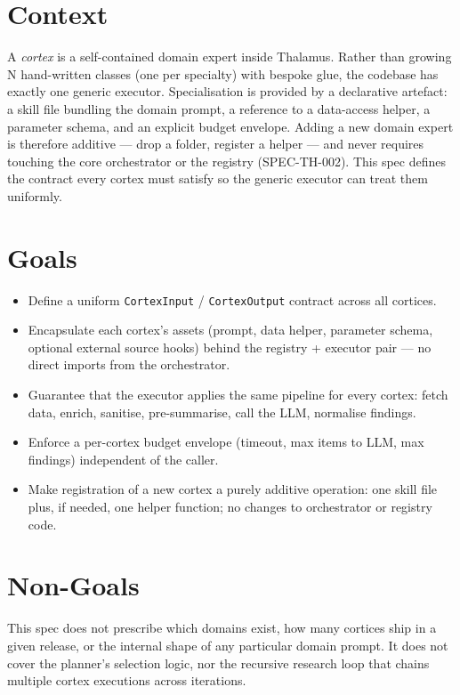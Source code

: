 




\makespecheader

\section{Context}
A \emph{cortex} is a self-contained domain expert inside Thalamus. Rather than growing N hand-written classes (one per specialty) with bespoke glue, the codebase has exactly one generic executor. Specialisation is provided by a declarative artefact: a skill file bundling the domain prompt, a reference to a data-access helper, a parameter schema, and an explicit budget envelope. Adding a new domain expert is therefore additive --- drop a folder, register a helper --- and never requires touching the core orchestrator or the registry (SPEC-TH-002). This spec defines the contract every cortex must satisfy so the generic executor can treat them uniformly.

\section{Goals}
\begin{itemize}[leftmargin=1.2em]
  \item Define a uniform \texttt{CortexInput} / \texttt{CortexOutput} contract across all cortices.
  \item Encapsulate each cortex's assets (prompt, data helper, parameter schema, optional external source hooks) behind the registry + executor pair --- no direct imports from the orchestrator.
  \item Guarantee that the executor applies the same pipeline for every cortex: fetch data, enrich, sanitise, pre-summarise, call the LLM, normalise findings.
  \item Enforce a per-cortex budget envelope (timeout, max items to LLM, max findings) independent of the caller.
  \item Make registration of a new cortex a purely additive operation: one skill file plus, if needed, one helper function; no changes to orchestrator or registry code.
\end{itemize}

\section{Non-Goals}
\begin{nongoal}
This spec does not prescribe which domains exist, how many cortices ship in a given release, or the internal shape of any particular domain prompt. It does not cover the planner's selection logic, nor the recursive research loop that chains multiple cortex executions across iterations.
\end{nongoal}

